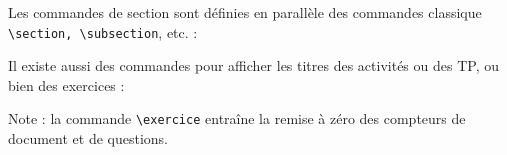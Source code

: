 

\addtocounter{section}{-1}
Les commandes de section sont définies en parallèle des commandes classique \lstinline|\section, \subsection|, etc. :
\begin{boiteCodeTex}{}


\end{boiteCodeTex}

Il existe aussi des commandes pour afficher les titres des activités ou des TP, ou bien des exercices :
\begin{boiteCodeTex}{}

\end{boiteCodeTex}
Note : la commande \lstinline|\exercice| entraîne la remise à zéro des compteurs de document et de questions.


